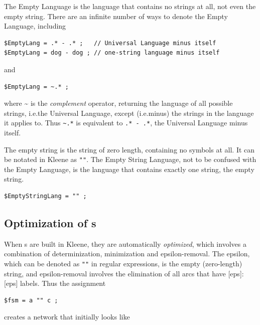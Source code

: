 The Empty Language is the language that contains no strings at all, not even the empty
string.  There are an infinite number of ways to denote the Empty Language, including

\begin{Verbatim}
$EmptyLang = .* - .* ;   // Universal Language minus itself
$EmptyLang = dog - dog ; // one-string language minus itself
\end{Verbatim}

\noindent
and

\begin{Verbatim}
$EmptyLang = ~.* ;
\end{Verbatim}

\noindent
where \~{} is the \emph{complement} operator, returning the language of all possible
strings, i.e.\@ the Universal Language, except
(i.e.\@ minus) the strings in the language it applies to.  Thus \texttt{\~{}.*} is
equivalent to \texttt{.* - .*}, the Universal Language minus itself.

The empty string is the string of zero length, containing no symbols at all.  It can be
notated in Kleene as \verb!""!.  The Empty String Language, not to be confused with the Empty
Language, is the language that contains exactly one string, the empty string.

\begin{Verbatim}
$EmptyStringLang = "" ;
\end{Verbatim}

\subsection{Optimization of \fsm{}s}

When \fsm{}s are built in Kleene, they are automatically \emph{optimized}, which involves a
combination of determinization, minimization and epsilon-removal.  The epsilon, which can be
denoted as \verb!""! in regular expressions, is the empty
(zero-length) string, and epsilon-removal involves the
elimination of all arcs that have [eps]:[eps] labels.  Thus the assignment


\begin{Verbatim}
$fsm = a "" c ;
\end{Verbatim}

\noindent
creates a network that initially looks like 

